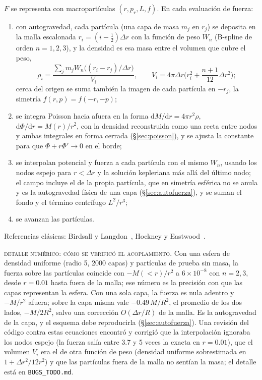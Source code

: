 \documentclass[11pt,a4paper]{article}
\newcommand{\dd}{\mathrm{d}}
\begin{document}
$F$ se representa con macropartículas $(r,p_r,L,f)$. En cada evaluación de fuerza:
\begin{enumerate}
  \item con autogravedad, cada partícula (una capa de masa $m_j$ en $r_j$) se deposita en
    la malla escalonada $r_i=(i-\tfrac12)\Delta r$ con la función de peso $W_n$
    (B-spline de orden $n=1,2,3$), y la densidad es esa masa entre el volumen que cubre
    el peso,
    \begin{equation}
      \rho_i=\frac{\sum_jm_jW_n\big((r_i-r_j)/\Delta r\big)}{V_i},\qquad
      V_i=4\pi\Delta r\Big(r_i^2+\frac{n+1}{12}\Delta r^2\Big);
    \end{equation}
    cerca del origen se suma también la imagen de cada partícula en $-r_j$, la simetría
    $f(r,p)=f(-r,-p)$;
  \item se integra Poisson hacia afuera en la forma $\dd M/\dd r=4\pi r^2\rho$,
    $\dd\Phi/\dd r=M(r)/r^2$, con la densidad reconstruida como una recta entre nodos y
    ambas integrales en forma cerrada (\S\ref{sec:poisson}), y se ajusta la constante
    para que $\Phi+r\Phi'\to0$ en el borde;
  \item se interpolan potencial y fuerza a cada partícula con el mismo $W_n$, usando los
    nodos espejo para $r<\Delta r$ y la solución kepleriana más allá del último nodo; el
    campo incluye el de la propia partícula, que en simetría esférica no se anula y es la
    autogravedad física de una capa (\S\ref{sec:autofuerza}), y se suman el fondo y el
    término centrífugo $L^2/r^3$;
  \item se avanzan las partículas.
\end{enumerate}
Referencias clásicas: Birdsall y Langdon~\cite{birdsall2004}, Hockney y
Eastwood~\cite{hockney1988}.

\begin{aviso}
\textsc{detalle numérico: cómo se verificó el acoplamiento.} Con una esfera de densidad
uniforme (radio 5, 2000 capas) y partículas de prueba sin masa, la fuerza sobre las
partículas coincide con $-M(<r)/r^2$ a $6\times10^{-8}$ con $n=2,3$, desde $r=0.01$
hasta fuera de la malla; ese número es la precisión con que las capas representan la
esfera. Con una sola capa, la fuerza es nula adentro y $-M/r^2$ afuera; sobre la capa
misma vale $-0.49\,M/R^2$, el promedio de los dos lados, $-M/2R^2$, salvo una corrección
$O(\Delta r/R)$ de la malla. Es la autogravedad de la capa, y el esquema debe
reproducirla (\S\ref{sec:autofuerza}). Una revisión del código contra estas
ecuaciones encontró y corrigió que la interpolación ignoraba los nodos espejo (la fuerza
salía entre 3.7 y 5 veces la exacta en $r=0.01$), que el volumen $V_i$ era el de otra
función de peso (densidad uniforme sobrestimada en $1+\Delta r^2/12r^2$) y que las
partículas fuera de la malla no sentían la masa; el detalle está en
\texttt{BUGS\_TODO.md}.
\end{aviso}
\end{document}
